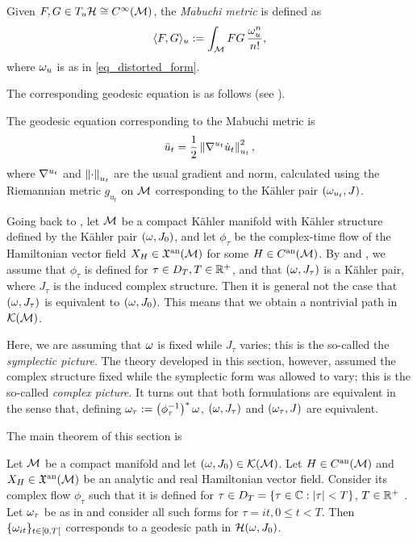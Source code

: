 \documentclass[notas.tex]{subfiles}
\begin{document}
\begin{defn}
	Given $F,G \in T_u \mathcal{H} \cong C^\infty(\mathcal{M})$, the \emph{Mabuchi metric} is defined as
	\begin{align*}
		\langle F,G \rangle_u := \int_{\mathcal{M}} FG \, \frac{\omega_u^n}{n!},
	\end{align*}
	where $\omega_u$ is as in \eqref{eq_distorted_form}.
\end{defn}

The corresponding geodesic equation is as follows (see \cite[Eq. (12)]{donaldson_symmetric_1999}).

\begin{prop}
	The geodesic equation corresponding to the Mabuchi metric is
	\begin{align*}
		\ddot u_t = \frac{1}{2}\left\lVert\nabla^{u_t}\dot u_t\right\rVert^2_{u_t},
	\end{align*}
	where $\nabla^{u_t}$ and $\left\lVert\cdot\right\rVert_{u_t}$ are the usual gradient and norm, calculated using the Riemannian metric $g_{u_t}$ on $\mathcal{M}$ corresponding to the Kähler pair $(\omega_{u_t},J)$.
\end{prop}

\begin{rem} \label{rem_symplectic_picture}
	Going back to , let $\mathcal{M}$ be a compact Kähler manifold with Kähler structure defined by the Kähler pair $(\omega, J_0)$, and let $\phi_\tau$ be the complex-time flow of the Hamiltonian vector field $X_H \in \mathfrak{X}^{\text{an}}(\mathcal{M})$ for some $H \in C^{\text{an}}(\mathcal{M})$. By  and , we assume that $\phi_\tau$ is defined for $\tau \in D_T, T \in \mathbb{R}^+$, and that $(\omega, J_\tau)$ is a Kähler pair, where $J_\tau$ is the induced complex structure. Then it is general not the case that $(\omega, J_\tau)$ is equivalent to $(\omega, J_0)$. This means that we obtain a nontrivial path in $\mathcal{K}(\mathcal{M})$. 
	
	Here, we are assuming that $\omega$ is fixed while $J_\tau$ varies; this is the so-called the \emph{symplectic picture}. The theory developed in this section, however, assumed the complex structure fixed while the symplectic form was allowed to vary; this is the so-called \emph{complex picture}. It turns out that both formulations are equivalent in the sense that, defining $\omega_\tau := \left( \phi_\tau^{-1} \right)^* \omega$, $(\omega, J_\tau)$ and $(\omega_\tau, J)$ are equivalent.
\end{rem}


The main theorem of this section is 
\begin{thm} \label{thm_complex_flow_geodesics}
	Let $\mathcal{M}$ be a compact manifold and let $(\omega, J_0) \in \mathcal{K}(\mathcal{M})$. Let $H \in C^{\text{an}}(\mathcal{M})$ and $X_H \in \mathfrak{X}^{\text{an}}(\mathcal{M})$ be an analytic and real Hamiltonian vector field. Consider its complex flow $\phi_\tau$ such that it is defined for $\tau \in D_T=\{\tau \in \mathbb{C} : \left|\tau\right| < T\}$, $T \in \mathbb{R}^+$ . Let $\omega_\tau$ be as in  and consider all such forms for $\tau = it, 0 \leq t < T$. Then $\{\omega_{it}\}_{t \in [0,T[}$ corresponds to a geodesic path in $\mathcal{H}(\omega, J_0)$.
\end{thm}
\end{document}
